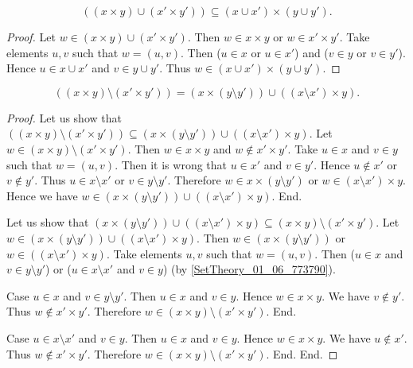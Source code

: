 \documentclass[../../set-theory.ftl.tex]{subfiles}
\begin{document}
\begin{forthel}
    \begin{proposition}\label{SetTheory_01_06_687547}
      \[ ((x \times y) \cup (x' \times y')) \subseteq (x \cup x') \times (y \cup y'). \]
    \end{proposition}
    \begin{proof}
      Let $w \in (x \times y) \cup (x' \times y')$.
      Then $w \in x \times y$ or $w \in x' \times y'$.
      Take elements $u,v$ such that $w = (u,v)$.
      Then ($u \in x$ or $u \in x'$) and ($v \in y$ or $v \in y'$).
      Hence $u \in x \cup x'$ and $v \in y \cup y'$.
      Thus $w \in (x \cup x') \times (y \cup y')$.
    \end{proof}

    \begin{proposition}\label{SetTheory_01_06_247770}
      \[ ((x \times y) \setminus (x' \times y')) = (x \times (y \setminus y')) \cup ((x \setminus x') \times y). \]
    \end{proposition}
    \begin{proof}
      Let us show that $((x \times y) \setminus (x' \times y')) \subseteq (x \times (y \setminus y')) \cup ((x \setminus x') \times y)$.
        Let $w \in (x \times y) \setminus (x' \times y')$.
        Then $w \in x \times y$ and $w \notin x' \times y'$.
        Take $u \in x$ and $v \in y$ such that $w = (u,v)$.
        Then it is wrong that $u \in x'$ and $v \in y'$.
        Hence $u \notin x'$ or $v \notin y'$.
        Thus $u \in x \setminus x'$ or $v \in y \setminus y'$.
        Therefore $w \in x \times (y \setminus y')$ or $w \in (x \setminus x') \times y$.
        Hence we have $w \in (x \times (y \setminus y')) \cup ((x \setminus x') \times y)$.
      End.

      Let us show that $(x \times (y \setminus y')) \cup ((x \setminus x') \times y) \subseteq (x \times y) \setminus (x' \times y')$.
        Let $w \in (x \times (y \setminus y')) \cup ((x \setminus x') \times y)$.
        Then $w \in (x \times (y \setminus y'))$ or $w \in ((x \setminus x') \times y)$.
        Take elements $u,v$ such that $w = (u,v)$.
        Then ($u \in x$ and $v \in y \setminus y'$) or ($u \in x \setminus x'$ and $v \in y$) (by \ref{SetTheory_01_06_773790}).

        Case $u \in x$ and $v \in y \setminus y'$.
          Then $u \in x$ and $v \in y$.
          Hence $w \in x \times y$.
          We have $v \notin y'$.
          Thus $w \notin x' \times y'$.
          Therefore $w \in (x \times y) \setminus (x' \times y')$.
        End.

        Case $u \in x \setminus x'$ and $v \in y$.
          Then $u \in x$ and $v \in y$.
          Hence $w \in x \times y$.
          We have $u \notin x'$.
          Thus $w \notin x' \times y'$.
          Therefore $w \in (x \times y) \setminus (x' \times y')$.
        End.
      End.
    \end{proof}
  \end{forthel}
\end{document}
